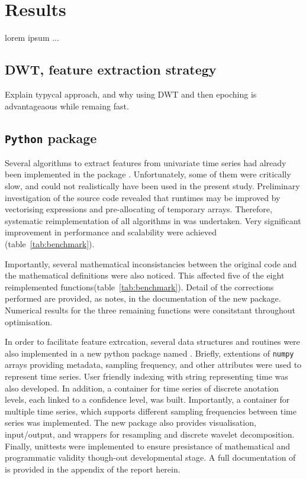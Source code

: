 \section{Results} \label{results}

lorem ipsum ...

\subsection{DWT, feature extraction strategy}
Explain typycal approach, and why using DWT and then epoching is advantageaous while remaing fast.


\subsection{\texttt{Python} package}
Several algorithms to extract features from univariate time series had already been implemented in the \py{} package \pyeeg{}\citationneeded{}.
Unfortunately, some of them were critically slow, and could not realistically have been used in the present study.
Preliminary investigation of the source code revealed that runtimes may be improved by vectorising expressions and pre-allocating of temporary arrays.
Therefore, systematic reimplementation of all algorithms in \pyeeg{} was undertaken.
Very significant improvement in performance and scalability were achieved (table~\ref{tab:benchmark}).

Importantly, several mathematical inconsistancies between the original code and the mathematical definitions were also noticed.
This affected five of the eight reimplemented functions(table~\ref{tab:benchmark}). 
Detail of the corrections performed are provided, as notes, in the documentation of the new package.
Numerical results for the three remaining functions were consitstant throughout optimisation.

In order to facilitate feature extrcation, several data structures and routines were also implemented 
in a new python package named \pr{}.
Briefly, extentions of \texttt{numpy} arrays providing metadata, sampling frequency, and other attributes were used to represent time series. 
User friendly indexing with string representing time was also developed.
In addition, a container for time series of discrete anotation levels, each linked to a confidence level, was built.
Importantly, a container for multiple time series, which supports different sampling frequencies
between time series was implemented.
The new package also provides visualisation, input/output, and wrappers for resampling and discrete wavelet decomposition.
Finally, unittests were implemented to ensure presistance of mathematical and programmatic validity though-out developmental stage.
A full documentation of \pr{} is provided in the appendix of the report herein.


